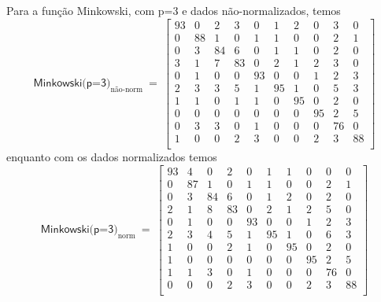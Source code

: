 \documentclass[10pt,a4paper,twocolumn]{article}
\begin{document}
      Para a função Minkowski, com p=3 e dados não-normalizados, temos
      \begin{equation*}
        \textsf{Minkowski(p=3)}_\text{não-norm}~=~ \left [
        \begin{smallmatrix}
          93 &  0 &  2 &  3 &  0 &  1 &  2 &  0 &  3 &  0 \\
           0 & 88 &  1 &  0 &  1 &  1 &  0 &  0 &  2 &  1 \\ 
           0 &  3 & 84 &  6 &  0 &  1 &  1 &  0 &  2 &  0 \\ 
           3 &  1 &  7 & 83 &  0 &  2 &  1 &  2 &  3 &  0 \\ 
           0 &  1 &  0 &  0 & 93 &  0 &  0 &  1 &  2 &  3 \\ 
           2 &  3 &  3 &  5 &  1 & 95 &  1 &  0 &  5 &  3 \\ 
           1 &  1 &  0 &  1 &  1 &  0 & 95 &  0 &  2 &  0 \\ 
           0 &  0 &  0 &  0 &  0 &  0 &  0 & 95 &  2 &  5 \\ 
           0 &  3 &  3 &  0 &  1 &  0 &  0 &  0 & 76 &  0 \\ 
           1 &  0 &  0 &  2 &  3 &  0 &  0 &  2 &  3 & 88 \\ 
        \end{smallmatrix} \right ]
      \end{equation*}
      enquanto com os dados normalizados temos
      \begin{equation*}
        \textsf{Minkowski(p=3)}_\text{norm}~=~ \left [
        \begin{smallmatrix}
          93 &  4 &  0 &  2 &  0 &  1 &  1 &  0 &  0 &  0 \\
           0 & 87 &  1 &  0 &  1 &  1 &  0 &  0 &  2 &  1 \\ 
           0 &  3 & 84 &  6 &  0 &  1 &  2 &  0 &  2 &  0 \\ 
           2 &  1 &  8 & 83 &  0 &  2 &  1 &  2 &  5 &  0 \\ 
           0 &  1 &  0 &  0 & 93 &  0 &  0 &  1 &  2 &  3 \\ 
           2 &  3 &  4 &  5 &  1 & 95 &  1 &  0 &  6 &  3 \\ 
           1 &  0 &  0 &  2 &  1 &  0 & 95 &  0 &  2 &  0 \\ 
           1 &  0 &  0 &  0 &  0 &  0 &  0 & 95 &  2 &  5 \\ 
           1 &  1 &  3 &  0 &  1 &  0 &  0 &  0 & 76 &  0 \\ 
           0 &  0 &  0 &  2 &  3 &  0 &  0 &  2 &  3 & 88 \\ 
        \end{smallmatrix} \right ]
      \end{equation*}
\end{document}
